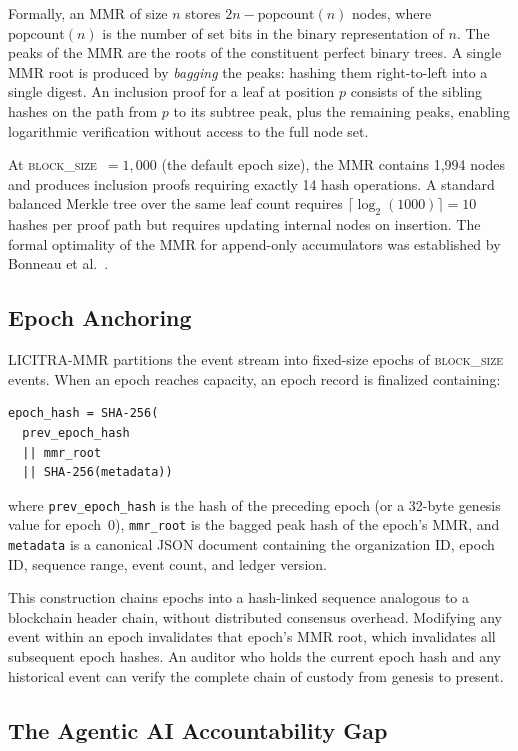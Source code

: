\documentclass{article}
\begin{document}
Formally, an MMR of size $n$ stores $2n - \text{popcount}(n)$ nodes, where
$\text{popcount}(n)$ is the number of set bits in the binary representation of
$n$. The peaks of the MMR are the roots of the constituent perfect binary trees.
A single MMR root is produced by \emph{bagging} the peaks: hashing them
right-to-left into a single digest. An inclusion proof for a leaf at position
$p$ consists of the sibling hashes on the path from $p$ to its subtree peak,
plus the remaining peaks, enabling logarithmic verification without access to
the full node set.

At \textsc{block\_size}~$= 1{,}000$ (the default epoch size), the MMR contains
1,994 nodes and produces inclusion proofs requiring exactly 14 hash operations.
A standard balanced Merkle tree over the same leaf count requires
$\lceil\log_2(1000)\rceil = 10$ hashes per proof path but requires updating
internal nodes on insertion. The formal optimality of the MMR for append-only
accumulators was established by Bonneau et al.~\cite{bonneau2025}.

\subsection{Epoch Anchoring}

LICITRA-MMR partitions the event stream into fixed-size epochs of
\textsc{block\_size} events. When an epoch reaches capacity, an epoch record is
finalized containing:

\begin{lstlisting}
epoch_hash = SHA-256(
  prev_epoch_hash
  || mmr_root
  || SHA-256(metadata))
\end{lstlisting}

where \texttt{prev\_epoch\_hash} is the hash of the preceding epoch (or a
32-byte genesis value for epoch~0), \texttt{mmr\_root} is the bagged peak hash
of the epoch's MMR, and \texttt{metadata} is a canonical JSON document
containing the organization ID, epoch ID, sequence range, event count, and
ledger version.

This construction chains epochs into a hash-linked sequence analogous to a
blockchain header chain, without distributed consensus overhead. Modifying any
event within an epoch invalidates that epoch's MMR root, which invalidates all
subsequent epoch hashes. An auditor who holds the current epoch hash and any
historical event can verify the complete chain of custody from genesis to
present.

\subsection{The Agentic AI Accountability Gap}
\end{document}
